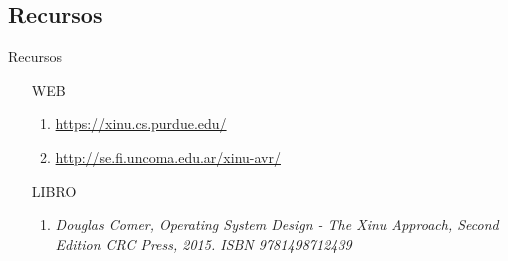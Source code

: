 \documentclass[8pt,aspectratio=169,compress]{beamer}
\begin{document}
\subsection{Recursos}




\begin{frame}{Recursos}

\begin{itemize}

\item [WEB]
\begin{enumerate}
\item \textcolor{blue}{\footnotesize \url{https://xinu.cs.purdue.edu/}}
\item \textcolor{blue}{\footnotesize \url{http://se.fi.uncoma.edu.ar/xinu-avr/}}
\end{enumerate}

\item [LIBRO]

\begin{enumerate}
\item \textit{Douglas Comer, Operating System Design - The Xinu Approach, Second Edition CRC Press, 2015. ISBN 9781498712439}
\end{enumerate}

\end{itemize}



\end{frame}
\end{document}
